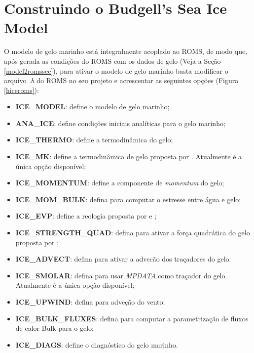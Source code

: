 \chapter{Construindo o Budgell's Sea Ice Model}
\bigskip

\noindent O modelo de gelo marinho está integralmente acoplado ao ROMS, de modo que, após gerada as condições do 
          ROMS com os dados de gelo (Veja a Seção \textcolor{bleu_cite}{\ref{model2romssec}}), para ativar o modelo 
          de gelo marinho basta modificar o arquivo \textit{.h} do ROMS no seu projeto e acrescentar as seguintes 
          opções (Figura \textcolor{bleu_cite}{\ref{hiceroms}}):
\bigskip

\begin{itemize}
    \item \textbf{ICE\_MODEL}: define o modelo de gelo marinho;
    \item \textbf{ANA\_ICE}: define condições iniciais analíticas para o gelo marinho;
    \item \textbf{ICE\_THERMO}: define a termodinâmica do gelo;  
    \item \textbf{ICE\_MK}: define a termodinâmica de gelo proposta por \textcite{Mellor1989}. Atualmente é a única opção disponível;
    \item \textbf{ICE\_MOMENTUM}: define a componente de \textit{momentum} do gelo;
    \item \textbf{ICE\_MOM\_BULK}: defina para computar o estresse entre água e gelo;
    \item \textbf{ICE\_EVP}: define a reologia proposta por \textcite{Hunke1997} e \textcite{Hunke2001};
    \item \textbf{ICE\_STRENGTH\_QUAD}: defina para ativar a força quadrática do gelo proposta por \textcite{Overland1988};
    \item \textbf{ICE\_ADVECT}: defina para ativar a advecão dos traçadores do gelo.
    \item \textbf{ICE\_SMOLAR}: defina para usar \textit{MPDATA} como traçador do gelo. Atualmente é a única opção disponível;   
    \item \textbf{ICE\_UPWIND}: defina para adveção do vento;
    \item \textbf{ICE\_BULK\_FLUXES}: defina para computar a parametrização de fluxos de calor Bulk para o gelo;
    \item \textbf{ICE\_DIAGS}: define o diagnóstico do gelo marinho.
\end{itemize}
\bigskip

